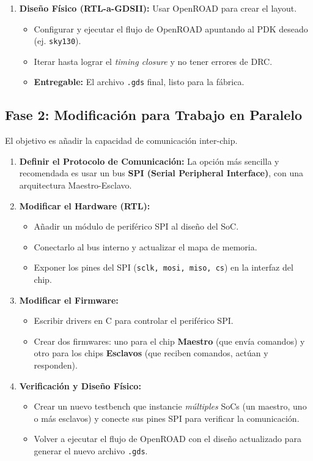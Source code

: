 \documentclass[12pt,a4paper]{article}
\begin{document}
\begin{enumerate}
    \item \textbf{Diseño Físico (RTL-a-GDSII):} Usar OpenROAD para crear el layout.
    \begin{itemize}
        \item Configurar y ejecutar el flujo de OpenROAD apuntando al PDK deseado (ej. \texttt{sky130}).
        \item Iterar hasta lograr el \textit{timing closure} y no tener errores de DRC.
        \item \textbf{Entregable:} El archivo \texttt{.gds} final, listo para la fábrica.
    \end{itemize}
\end{enumerate}

\subsection{Fase 2: Modificación para Trabajo en Paralelo}

El objetivo es añadir la capacidad de comunicación inter-chip.

\begin{enumerate}
    \item \textbf{Definir el Protocolo de Comunicación:} La opción más sencilla y recomendada es usar un bus \textbf{SPI (Serial Peripheral Interface)}, con una arquitectura Maestro-Esclavo.
    
    \item \textbf{Modificar el Hardware (RTL):}
    \begin{itemize}
        \item Añadir un módulo de periférico SPI al diseño del SoC.
        \item Conectarlo al bus interno y actualizar el mapa de memoria.
        \item Exponer los pines del SPI (\texttt{sclk, mosi, miso, cs}) en la interfaz del chip.
    \end{itemize}

    \item \textbf{Modificar el Firmware:}
    \begin{itemize}
        \item Escribir drivers en C para controlar el periférico SPI.
        \item Crear dos firmwares: uno para el chip \textbf{Maestro} (que envía comandos) y otro para los chips \textbf{Esclavos} (que reciben comandos, actúan y responden).
    \end{itemize}

    \item \textbf{Verificación y Diseño Físico:}
    \begin{itemize}
        \item Crear un nuevo testbench que instancie \textit{múltiples} SoCs (un maestro, uno o más esclavos) y conecte sus pines SPI para verificar la comunicación.
        \item Volver a ejecutar el flujo de OpenROAD con el diseño actualizado para generar el nuevo archivo \texttt{.gds}.
    \end{itemize}
\end{enumerate}
\end{document}

